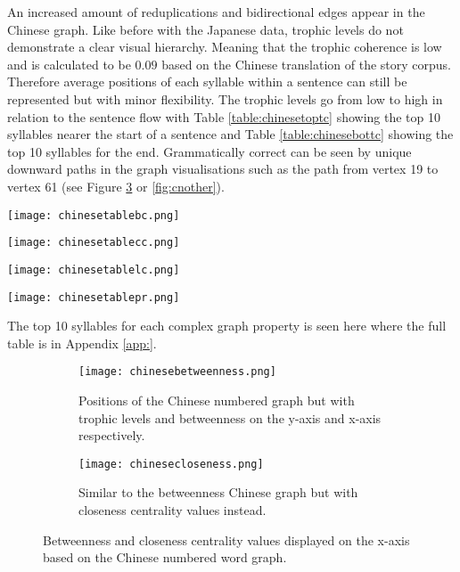 An increased amount of reduplications and bidirectional edges appear in the Chinese graph. Like before with the Japanese data, trophic levels do not demonstrate a clear visual hierarchy. Meaning that the trophic coherence is low and is calculated to be $0.09$ based on the Chinese translation of the story corpus. Therefore average positions of each syllable within a sentence can still be represented but with minor flexibility. The trophic levels go from low to high in relation to the sentence flow with Table \ref{table:chinesetoptc} showing the top 10 syllables nearer the start of a sentence and Table \ref{table:chinesebottc} showing the top 10 syllables for the end. Grammatically correct can be seen by unique downward paths in the graph visualisations such as the path from vertex 19 to vertex 61 (see Figure \ref{fig:cncentrality} or \ref{fig:cnother}).

\begin{table}[H]
\centering
\begin{subtable}{.2\textwidth}
	\centering
	\texttt{[image: chinesetablebc.png]}
	\caption{}
	\label{table:chinesetablebc}
\end{subtable}
\hfill
\begin{subtable}{.2\textwidth}
	\centering
	\texttt{[image: chinesetablecc.png]}
	\caption{}
	\label{table:chinesetablecc}
\end{subtable}
\hfill
\begin{subtable}{.2\textwidth}
	\centering
	\texttt{[image: chinesetablelc.png]}
	\caption{}
	\label{table:chinesetablelc}
\end{subtable}
\hfill
\begin{subtable}{.2\textwidth}
	\centering
	\texttt{[image: chinesetablepr.png]}
	\caption{}
	\label{table:chinesetablepr}
\end{subtable}
\caption{}
\end{table}

The top 10 syllables for each complex graph property is seen here where the full table is in Appendix \ref{app:}.

\begin{figure}[H]
\centering
\begin{subfigure}{.45\textwidth}
	\hspace{-1cm} 
	\texttt{[image: chinesebetweenness.png]}
	\caption{Positions of the Chinese numbered graph but with trophic levels and betweenness on the y-axis and x-axis respectively.}
	\label{fig:cnbc}
\end{subfigure}
\hfill
\begin{subfigure}{.45\textwidth}
	\hspace{-1cm} 
	\texttt{[image: chinesecloseness.png]}
	\caption{Similar to the betweenness Chinese graph but with closeness centrality values instead. }
	\label{fig:cncc}
\end{subfigure}
\caption{Betweenness and closeness centrality values displayed on the x-axis based on the Chinese numbered word graph.}
\label{fig:cncentrality}
\end{figure}

